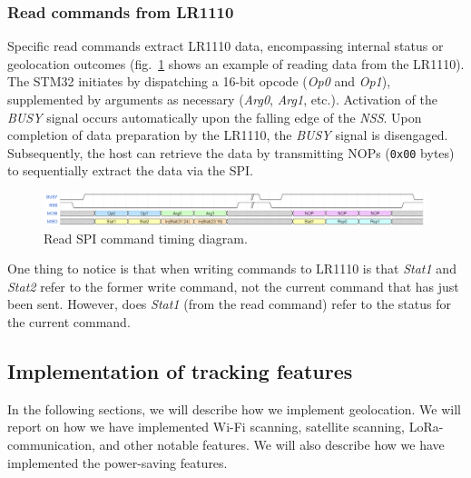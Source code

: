 \subsubsection{Read commands from LR1110}
Specific read commands extract LR1110 data, encompassing internal status or geolocation outcomes (fig.~\ref{fig:read_command} shows an example of reading data from the LR1110). The STM32 initiates by dispatching a 16-bit opcode (\textit{Op0} and \textit{Op1}), supplemented by arguments as necessary (\textit{Arg0}, \textit{Arg1}, etc.). Activation of the \textit{BUSY} signal occurs automatically upon the falling edge of the \textit{NSS}. Upon completion of data preparation by the LR1110, the \textit{BUSY} signal is disengaged. Subsequently, the host can retrieve the data by transmitting NOPs (\texttt{0x00} bytes) to sequentially extract the data via the \ac{SPI}.

\begin{figure}[H]
    \centering
    \includegraphics[width=1\textwidth]{figures/read_command.png}
    \caption{Read SPI command timing diagram.}
    \label{fig:read_command}
\end{figure}

One thing to notice is that when writing commands to LR1110 is that \textit{Stat1} and \textit{Stat2} refer to the former write command, not the current command that has just been sent. However, does \textit{Stat1} (from the read command) refer to the status for the current command.

\subsection{Implementation of tracking features}
In the following sections, we will describe how we implement geolocation. We will report on how we have implemented Wi-Fi scanning, satellite scanning, \ac{LoRa}-communication, and other notable features. We will also describe how we have implemented the power-saving features.

